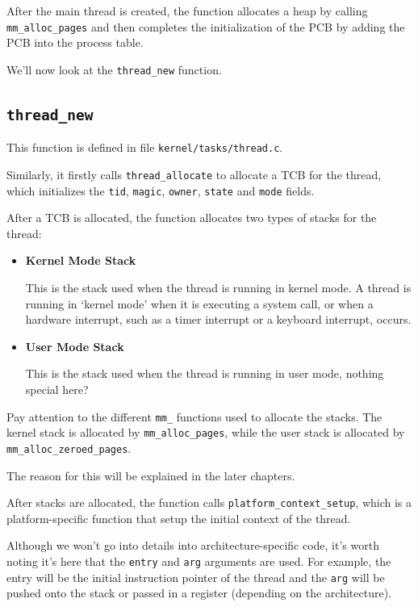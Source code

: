 After the main thread is created, the function allocates a heap by calling \texttt{mm\_alloc\_pages}
and then completes the initialization of the PCB by adding the PCB into the process table.

We'll now look at the \texttt{thread\_new} function.

\subsection{\texttt{thread\_new}}

This function is defined in file \texttt{kernel/tasks/thread.c}.

Similarly, it firstly calls \texttt{thread\_allocate} to allocate a TCB for the thread, which
initializes the \texttt{tid}, \texttt{magic}, \texttt{owner}, \texttt{state} and \texttt{mode}
fields.

After a TCB is allocated, the function allocates two types of stacks for the thread:

\begin{itemize}
    \item \textbf{Kernel Mode Stack}

          This is the stack used when the thread is running in kernel mode. A thread is running
          in `kernel mode' when it is executing a system call, or when a hardware interrupt, such as
          a timer interrupt or a keyboard interrupt, occurs.

    \item \textbf{User Mode Stack}

          This is the stack used when the thread is running in user mode, nothing special here?
\end{itemize}

\begin{tip}
    \item Pay attention to the different \texttt{mm\_} functions used to allocate the stacks.
    The kernel stack is allocated by \texttt{mm\_alloc\_pages}, while the user stack is
    allocated by \texttt{mm\_alloc\_zeroed\_pages}.
    \item The reason for this will be explained in the later chapters.
\end{tip}

After stacks are allocated, the function calls \texttt{platform\_context\_setup}, which is
a platform-specific function that setup the initial context of the thread.

Although we won't go into details into architecture-specific code, it's worth noting it's here
that the \texttt{entry} and \texttt{arg} arguments are used. For example, the entry will be
the initial instruction pointer of the thread and the \texttt{arg} will be pushed onto the stack
or passed in a register (depending on the architecture).

